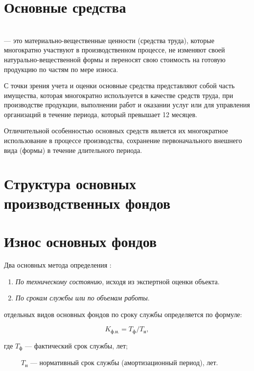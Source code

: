 \section{Основные средства}

\begin{definition}
    \normalfont
    ~\\
     --- это материально-вещественные ценности (средства
    труда), которые многократно участвуют в производственном процессе, не
    изменяют своей натурально-вещественной формы и переносят свою стоимость на
    готовую продукцию по частям по мере износа.
\end{definition}

С точки зрения учета и оценки основные средства представляют собой часть
имущества, которая многократно используется в качестве средств труда, при
производстве продукции, выполнении работ и оказании услуг или для управления
организаций в течение периода, который превышает 12 месяцев.

Отличительной особенностью основных средств является их многократное
использование в процессе производства, сохранение первоначального внешнего вида
(формы) в течение длительного периода.

\section{Структура основных производственных фондов}

\section{Износ основных фондов}

Два основных метода определения :

\begin{enumerate}
    \item \textit{По техническому состоянию}, исходя из экспертной оценки объекта.
    \item \textit{По срокам службы или по объемам работы}.
\end{enumerate}

\begin{tcolorbox}
 отдельных видов основных фондов по сроку
службы определяется по формуле:

\begin{equation}
    K_{\text{ф.н.}} = T_{\text{ф}}/T_{\text{н}},
\end{equation}

где $T_{\text{ф}}$ --- фактический срок службы, лет;

~~~~~$T_{\text{н}}$ --- нормативный срок службы (амортизационный период), лет.
\end{tcolorbox}

